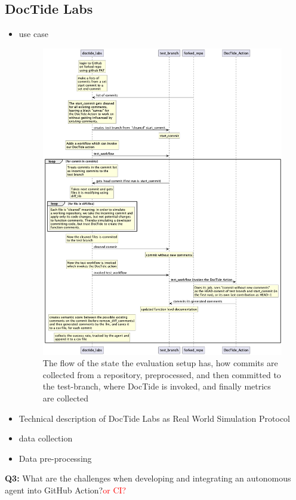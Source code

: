 \subsection{DocTide Labs}
\label{sec:DocTideLabs}
\begin{itemize}
    \item use case
    \begin{figure}[H]
\centering
\includegraphics[width=0.7\linewidth]{Figures/doctide_labs_flow_chart.png}
\caption{The flow of the state the evaluation setup has, how commits are collected from a repository, preprocessed, and then committed to the test-branch, where DocTide is invoked, and finally metrics are collected}
\label{fig:flow_labs}
\end{figure}
    \item Technical description of DocTide Labs as Real World Simulation Protocol
    \item data collection
    \item Data pre-processing 
\end{itemize}
\textbf{Q3: }What are the challenges when developing and integrating an autonomous agent into GitHub Action?\textcolor{red}{or CI?}
